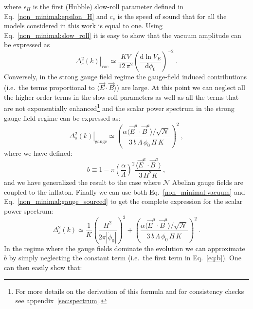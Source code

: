 where $\epsilon_H$ is the first (Hubble) slow-roll parameter defined in Eq.~\eqref{non_minimal:epsilon_H} and $c_s$ is the speed of sound that for all the models considered in this work is equal to one. Using Eq.~\eqref{non_minimal:slow_roll} it is easy to show that the vacuum amplitude can be expressed as
\begin{equation}
	\label{non_minimal:vacuum}
	\left.   \Delta^2_s (k) \right|_\text{vac} \simeq   \frac{ K V }{12 \, \pi^2 }  \left( \frac{\textrm{d} \ln V_E}{\textrm{d} \phi_0}\right)^{-2} \ .
\end{equation}
Conversely, in the strong gauge field regime the gauge-field induced contributions (i.e.\ the terms proportional to $\langle \vec{E}\cdot\vec{B} \rangle $) are large. At this point we can neglect all the higher order terms in the slow-roll parameters as well as all the terms that are not exponentially enhanced\footnote{For more details on the derivation of this formula and for consistency checks see appendix~\ref{sec:spectrum}.} and the scalar power spectrum in the strong gauge field regime can be expressed as:
 \begin{equation}
 	\label{non_minimal:gauge_sourced}
 	\left.  \Delta^2_s (k) \right|_\text{gauge} \simeq  \left(\frac{\alpha \langle \vec{E}^a \cdot \vec{B}^a  \rangle / \sqrt{\mathcal{N}} }{3 \, b \, \Lambda \, \dot{\phi}_0 \, H \, K }\right)^2  \ ,
 \end{equation}
  where we have defined:
\begin{equation}
	b \equiv  1  -  \pi \left( \frac{\alpha}{\Lambda} \right)^2  \frac{\langle \vec{E}^a \cdot \vec{B}^a  \rangle}{3 \, H^2 K} \ ,
	\label{eq:b}
\end{equation}
and we have generalized the result to the case where $\mathcal{N}$ Abelian gauge fields are coupled to the inflaton. Finally we can use both Eq.~\eqref{non_minimal:vacuum} and Eq.~\eqref{non_minimal:gauge_sourced} to get the complete expression for the scalar power spectrum:
 \begin{equation}
 	\label{non_minimal:scalar_final}
 	\Delta^2_s (k) \simeq  \frac{ 1 }{K}  \left( \frac{H^2 }{2 \pi |\dot{\phi}_0|}\right)^{2} + \left(\frac{\alpha \langle \vec{E}^a \cdot \vec{B}^a  \rangle / \sqrt{\mathcal{N}} }{3 \, b \, \Lambda \, \dot{\phi}_0 \, H \, K }\right)^2 \ .
 \end{equation}
In the regime where the gauge fields dominate the evolution we can approximate $b$ by simply neglecting the constant term (i.e.\ the first term in Eq.~\eqref{eq:b}). One can then easily show that:
